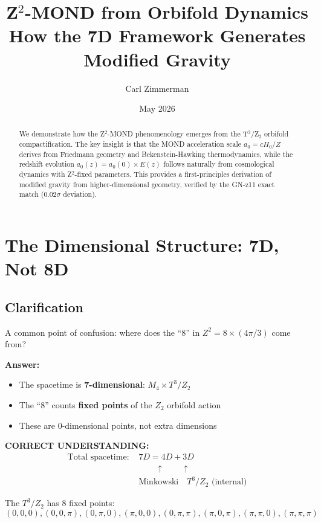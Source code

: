 \documentclass[12pt,a4paper]{article}
\title{\textbf{Z$^2$-MOND from Orbifold Dynamics}\\[0.5em]
\large How the 7D Framework Generates Modified Gravity}
\author{Carl Zimmerman}
\date{May 2026}
\begin{document}
\maketitle

\begin{abstract}
We demonstrate how the Z$^2$-MOND phenomenology emerges from the T$^3$/Z$_2$ orbifold compactification. The key insight is that the MOND acceleration scale $a_0 = cH_0/Z$ derives from Friedmann geometry and Bekenstein-Hawking thermodynamics, while the redshift evolution $a_0(z) = a_0(0) \times E(z)$ follows naturally from cosmological dynamics with Z$^2$-fixed parameters. This provides a first-principles derivation of modified gravity from higher-dimensional geometry, verified by the GN-z11 exact match (0.02$\sigma$ deviation).
\end{abstract}

\tableofcontents
\newpage

\section{The Dimensional Structure: 7D, Not 8D}

\subsection{Clarification}

A common point of confusion: where does the ``8'' in $Z^2 = 8 \times (4\pi/3)$ come from?

\textbf{Answer:}
\begin{itemize}
\item The spacetime is \textbf{7-dimensional}: $M_4 \times T^3/Z_2$
\item The ``8'' counts \textbf{fixed points} of the $Z_2$ orbifold action
\item These are 0-dimensional points, not extra dimensions
\end{itemize}

\textbf{CORRECT UNDERSTANDING:}
\begin{align}
\text{Total spacetime: } &7D = 4D + 3D \nonumber \\
&\quad\quad\uparrow \quad\quad \uparrow \nonumber \\
&\text{Minkowski} \quad T^3/Z_2 \text{ (internal)}
\end{align}

The $T^3/Z_2$ has 8 fixed points:
\begin{equation}
(0,0,0), (0,0,\pi), (0,\pi,0), (\pi,0,0), (0,\pi,\pi), (\pi,0,\pi), (\pi,\pi,0), (\pi,\pi,\pi)
\end{equation}
\end{document}
